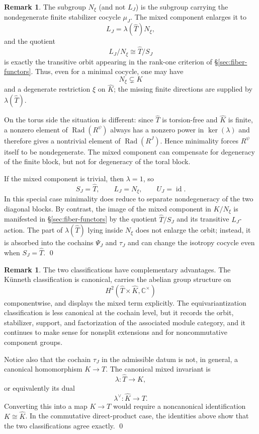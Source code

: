 \documentclass{amsart}
\theoremstyle{definition}
\newtheorem{remark}[theorem]{Remark}
\newcommand{\id}{\operatorname{id}}
\newcommand{\Rad}{\operatorname{Rad}}
\newcommand{\Ctimes}{\mathbb{C}^{\times}}
\numberwithin{equation}{section}
\begin{document}
\begin{remark}
\label{rem:mixed-component-comparison}
The subgroup $N_\xi$ (and not $L_J$) is the subgroup carrying the
nondegenerate finite stabilizer cocycle $\mu_J$.  The mixed component enlarges
it to
\[
 L_J=\lambda(\widehat T)N_\xi,
\]
and the quotient
\[
 L_J/N_\xi\cong \widehat T/S_J
\]
is exactly the transitive orbit appearing in the rank-one criterion of
\S\ref{sec:fiber-functors}.  Thus, even for a minimal cocycle, one may
have
\[
 N_\xi\subsetneq K
\]
and a degenerate restriction $\xi$ on $\widehat K$; the missing finite directions are
supplied by $\lambda(\widehat T)$.

On the torus side the situation is different: since $\widehat T$ is torsion-free and
$\widehat K$ is finite, a nonzero element of $\Rad(R^\psi)$ always has a nonzero power
in $\ker(\lambda)$ and therefore gives a nontrivial element of
$\Rad(R^J)$.  Hence minimality forces $R^\psi$ itself to be nondegenerate.
The mixed component can compensate for degeneracy of the finite block, but
not for degeneracy of the toral block.

If the mixed component is trivial, then $\lambda=1$, so
\[
 S_J=\widehat T,
 \qquad
 L_J=N_\xi,
 \qquad
 U_J=\id.
\]
In this special case minimality does reduce to separate nondegeneracy of the
two diagonal blocks.  By contrast, the image of the mixed component in
$K/N_\xi$ is manifested in \S\ref{sec:fiber-functors} by the quotient
$\widehat T/S_J$ and its transitive $L_J$-action.  The part of $\lambda(\widehat T)$ lying
inside $N_\xi$ does not enlarge the orbit; instead, it is absorbed into the
cochains $\Psi_J$ and $\tau_J$ and can change the isotropy cocycle even when
$S_J=\widehat T$. \qed
\end{remark}

\begin{remark}
The two classifications have complementary advantages.  The K\"unneth
classification is canonical, carries the abelian group structure on
\[
 H^2(\widehat T\times \widehat K,\Ctimes)
\]
componentwise, and displays the mixed term explicitly.  The
equivariantization classification is less canonical at the cochain level,
but it records the orbit, stabilizer, support, and factorization of the
associated module category, and it continues to make sense for nonsplit
extensions and for noncommutative component groups.

Notice also that the cochain $\tau_J$ in the admissible datum is not, in
general, a canonical homomorphism $K\to T$.  The canonical mixed invariant is
\[
 \lambda:\widehat T\to K,
\]
or equivalently its dual
\[
 \lambda^\vee:\widehat K\to T.
\]
Converting this into a map $K\to T$ would require a noncanonical
identification $K\cong\widehat K$.  In the commutative direct-product case,
the identities above show that the two classifications agree exactly. \qed
\end{remark}
\end{document}
